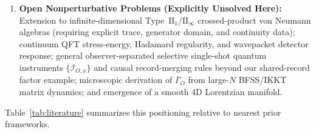\documentclass[11pt,a4paper]{article}
\theoremstyle{definition}
\theoremstyle{remark}
\newcommand{\cI}{\mathcal{I}}
\newcommand{\1}{\mathbf{1}}
\begin{document}
\begin{enumerate}
  \item \textbf{Open Nonperturbative Problems (Explicitly Unsolved Here):}
  Extension to infinite-dimensional Type~$\mathrm{II}_1/\mathrm{II}_\infty$ crossed-product von Neumann algebras (requiring explicit trace, generator domain, and continuity data); continuum QFT stress-energy, Hadamard regularity, and wavepacket detector response; general observer-separated selective single-shot quantum instruments $\{\cI_{O,x}\}$ and causal record-merging rules beyond our shared-record factor example; microscopic derivation of $\Gamma_O$ from large-$N$ BFSS/IKKT matrix dynamics; and emergence of a smooth 4D Lorentzian manifold.
\end{enumerate}

Table~\ref{tab:literature} summarizes this positioning relative to nearest prior frameworks.
\end{document}
